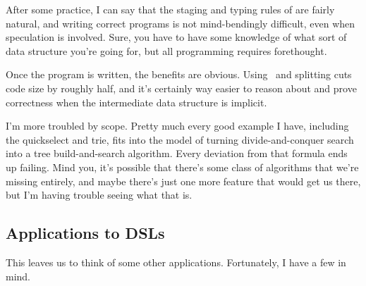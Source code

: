 After some practice, I can say that the staging and typing rules of \lang are fairly natural, 
and writing correct programs is not mind-bendingly difficult, even when speculation is involved.
Sure, you have to have some knowledge of what sort of data structure you're going for,
but all programming requires forethought.

Once the program is written, the benefits are obvious.
Using \lang\ and splitting cuts code size by roughly half,
and it's certainly way easier to reason about and prove correctness when the intermediate data structure is implicit.

I'm more troubled by scope.  
Pretty much every good example I have, including the quickselect and trie, fits into the model of turning
divide-and-conquer search into a tree build-and-search algorithm.  
Every deviation from that formula ends up failing.
Mind you, it's possible that there's some class of algorithms that we're missing entirely, 
and maybe there's just one more feature that would get us there,
but I'm having trouble seeing what that is.

\subsection {Applications to DSLs}

This leaves us to think of some other applications.  Fortunately, I have a few in mind.